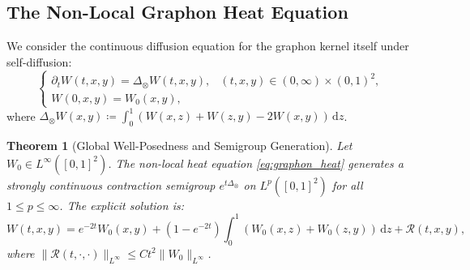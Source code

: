 \documentclass[11pt,a4paper,reqno]{amsart}
\newtheorem{theorem}{Theorem}[section]
\theoremstyle{definition}
\numberwithin{equation}{section}
\newcommand{\dif}{\,\mathrm{d}}
\begin{document}
\subsection{The Non-Local Graphon Heat Equation}
We consider the continuous diffusion equation for the graphon kernel itself under self-diffusion:
\begin{equation}
    \label{eq:graphon_heat}
    \begin{cases}
        \partial_t W(t, x, y) = \Delta_{\otimes} W(t, x, y), & (t, x, y) \in (0, \infty) \times (0, 1)^2, \\
        W(0, x, y) = W_0(x, y),
    \end{cases}
\end{equation}
where $\Delta_\otimes W(x, y) \coloneqq \int_0^1 (W(x, z) + W(z, y) - 2 W(x, y)) \dif z$.

\begin{theorem}[Global Well-Posedness and Semigroup Generation]
\label{thm:graphon_heat_existence}
Let $W_0 \in L^\infty([0, 1]^2)$. The non-local heat equation \eqref{eq:graphon_heat} generates a strongly continuous contraction semigroup $e^{t \Delta_\otimes}$ on $L^p([0, 1]^2)$ for all $1 \le p \le \infty$. The explicit solution is:
\begin{equation}
    W(t, x, y) = e^{-2t} W_0(x, y) + (1 - e^{-2t}) \int_0^1 (W_0(x, z) + W_0(z, y)) \dif z + \mathcal{R}(t, x, y),
\end{equation}
where $\|\mathcal{R}(t, \cdot, \cdot)\|_{L^\infty} \le C t^2 \|W_0\|_{L^\infty}$.
\end{theorem}
\end{document}
